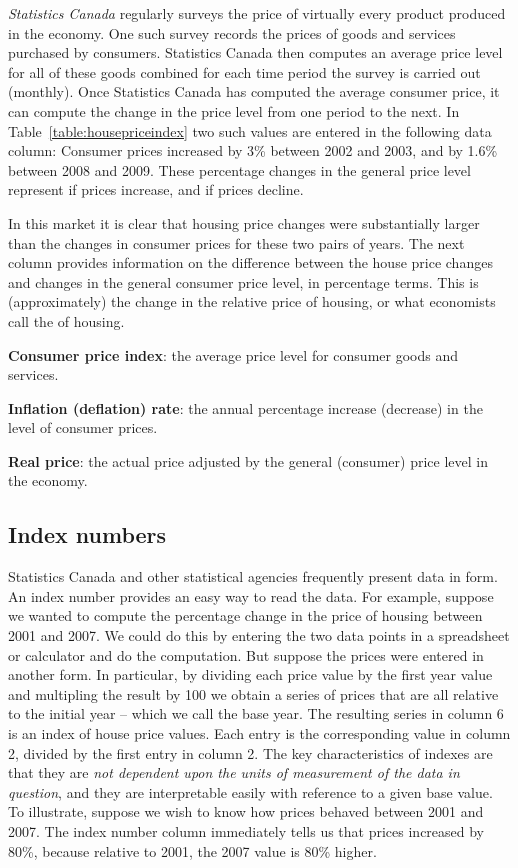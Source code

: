 \textit{Statistics Canada} regularly surveys the price of virtually every
product produced in the economy. One such survey records the prices of goods
and services purchased by consumers. Statistics Canada then computes an
average price level for all of these goods combined for each time period the
survey is carried out (monthly). Once Statistics Canada has computed the
average consumer price, it can compute the change in the price level from
one period to the next. In Table~\ref{table:housepriceindex} two such values are entered in the
following data column: Consumer prices increased by 3\% between 2002 and
2003, and by 1.6\% between 2008 and 2009. These percentage changes in the
general price level represent  if prices increase,
and  if prices decline.

In this market it is clear that housing price changes were substantially
larger than the changes in consumer prices for these two pairs of years. The
next column provides information on the difference between the house price
changes and changes in the general consumer price level, in percentage
terms. This is (approximately) the change in the relative price of housing,
or what economists call the  of housing.

\begin{DefBox}
\textbf{Consumer price index}: the average price level for consumer goods and services.

\textbf{Inflation (deflation) rate}: the annual percentage increase (decrease) in the level of consumer prices.

\textbf{Real price}: the actual price adjusted by the general (consumer) price level in the economy.
\end{DefBox}

\newhtmlpage

\subsection*{Index numbers}

Statistics Canada and other statistical agencies frequently present data in %
 form. An index number provides an easy
way to read the data. For example, suppose we wanted to compute the
percentage change in the price of housing between 2001 and 2007. We could do
this by entering the two data points in a spreadsheet or calculator and do
the computation. But suppose the prices were entered in another form. In
particular, by dividing each price value by the first year value and
multipling the result by 100 we obtain a series of prices that are all
relative to the initial year -- which we call the base year. The resulting
series in column 6 is an index of house price values. Each entry is the
corresponding value in column 2, divided by the first entry in column 2. The key
characteristics of indexes are that they are \textit{not dependent upon the
units of measurement of the data in question}, and they are interpretable
easily with reference to a given base value. To illustrate, suppose we wish
to know how prices behaved between 2001 and 2007. The index number column
immediately tells us that prices increased by 80\%, because relative to
2001, the 2007 value is 80\% higher.

